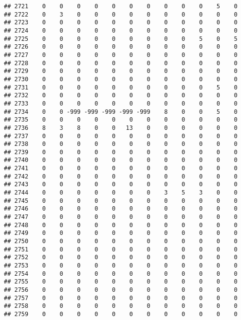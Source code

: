 \documentclass[]{article}
\begin{document}
\begin{verbatim}
## 2721    0    0    0    0    0    0    0    0    0    0    5    0
## 2722    0    3    0    0    0    0    0    0    0    0    0    0
## 2723    0    0    0    0    0    0    0    0    0    0    0    0
## 2724    0    0    0    0    0    0    0    0    0    0    0    0
## 2725    0    0    0    0    0    0    0    0    0    5    0    5
## 2726    0    0    0    0    0    0    0    0    0    0    0    0
## 2727    0    0    0    0    0    0    0    0    0    0    0    0
## 2728    0    0    0    0    0    0    0    0    0    0    0    0
## 2729    0    0    0    0    0    0    0    0    0    0    0    0
## 2730    0    0    0    0    0    0    0    0    0    0    0    0
## 2731    0    0    0    0    0    0    0    0    0    0    5    0
## 2732    0    0    0    0    0    0    0    0    0    0    0    0
## 2733    0    0    0    0    0    0    0    0    0    0    0    0
## 2734    0    0 -999 -999 -999 -999 -999    8    0    0    5    0
## 2735    0    0    0    0    0    0    0    0    0    0    0    0
## 2736    8    3    8    0    0   13    0    0    0    0    0    0
## 2737    0    0    0    0    0    0    0    0    0    0    0    0
## 2738    0    0    0    0    0    0    0    0    0    0    0    0
## 2739    0    0    0    0    0    0    0    0    0    0    0    0
## 2740    0    0    0    0    0    0    0    0    0    0    0    0
## 2741    0    0    0    0    0    0    0    0    0    0    0    0
## 2742    0    0    0    0    0    0    0    0    0    0    0    0
## 2743    0    0    0    0    0    0    0    0    0    0    0    0
## 2744    0    0    0    0    0    0    0    3    5    3    0    0
## 2745    0    0    0    0    0    0    0    0    0    0    0    0
## 2746    0    0    0    0    0    0    0    0    0    0    0    0
## 2747    0    0    0    0    0    0    0    0    0    0    0    0
## 2748    0    0    0    0    0    0    0    0    0    0    0    0
## 2749    0    0    0    0    0    0    0    0    0    0    0    0
## 2750    0    0    0    0    0    0    0    0    0    0    0    0
## 2751    0    0    0    0    0    0    0    0    0    0    0    0
## 2752    0    0    0    0    0    0    0    0    0    0    0    0
## 2753    0    0    0    0    0    0    0    0    0    0    0    0
## 2754    0    0    0    0    0    0    0    0    0    0    0    0
## 2755    0    0    0    0    0    0    0    0    0    0    0    0
## 2756    0    0    0    0    0    0    0    0    0    0    0    0
## 2757    0    0    0    0    0    0    0    0    0    0    0    0
## 2758    0    0    0    0    0    0    0    0    0    0    0    0
## 2759    0    0    0    0    0    0    0    0    0    0    0    0

\end{verbatim}
\end{document}
